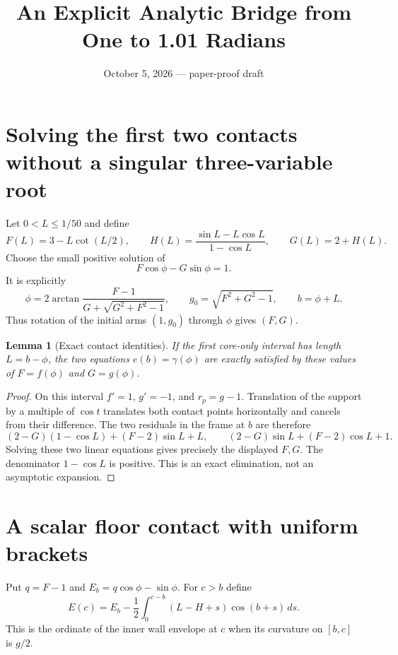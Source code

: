 \documentclass[11pt]{article}
\title{An Explicit Analytic Bridge from One to 1.01 Radians}
\author{}\date{October 5, 2026 --- paper-proof draft}
\newtheorem{lemma}[theorem]{Lemma}
\begin{document}
\maketitle

\section{Solving the first two contacts without a singular three-variable root}
Let $0<L\le1/50$ and define
\[
 F(L)=3-L\cot(L/2),\qquad
 H(L)=\frac{\sin L-L\cos L}{1-\cos L},\qquad G(L)=2+H(L).
\]
Choose the small positive solution of
\[
 F\cos\phi-G\sin\phi=1.
\]
It is explicitly
\[
 \phi=2\arctan\frac{F-1}{G+\sqrt{G^2+F^2-1}},\qquad
 g_0=\sqrt{F^2+G^2-1},\qquad b=\phi+L.
\]
Thus rotation of the initial arms $(1,g_0)$ through $\phi$ gives $(F,G)$.

\begin{lemma}[Exact contact identities]
If the first core-only interval has length $L=b-\phi$, the two equations $e(b)=\gamma(\phi)$ are exactly satisfied by these values of $F=f(\phi)$ and $G=g(\phi)$.
\end{lemma}
\begin{proof}
On this interval $f'=1$, $g'=-1$, and $r_p=g-1$. Translation of the support by a multiple of $\cos t$ translates both contact points horizontally and cancels from their difference. The two residuals in the frame at $b$ are therefore
\[
 (2-G)(1-\cos L)+(F-2)\sin L+L,
 \qquad (2-G)\sin L+(F-2)\cos L+1.
\]
Solving these two linear equations gives precisely the displayed $F,G$. The denominator $1-\cos L$ is positive. This is an exact elimination, not an asymptotic expansion.
\end{proof}

\section{A scalar floor contact with uniform brackets}
Put $q=F-1$ and $E_b=q\cos\phi-\sin\phi$. For $c>b$ define
\[
 E(c)=E_b-\frac12\int_0^{c-b}(L-H+s)\cos(b+s)\,ds.
\]
This is the ordinate of the inner wall envelope at $c$ when its curvature on $[b,c]$ is $g/2$.
\end{document}
